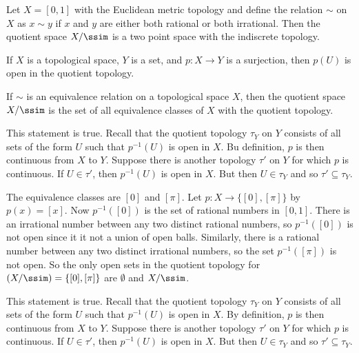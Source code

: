	\item Let $X = [0,1]$ with the Euclidean metric topology and define the relation $\sim$ on $X$ as $x \sim y$ if $x$ and $y$ are either both rational or both irrational. Then the quotient space $X/\ssim$ is a two point space with the indiscrete topology. 

	\item If $X$ is a topological space, $Y$ is a set, and $p: X \to Y$ is a surjection, then $p(U)$ is open in the quotient topology.

	\item If $\sim$ is an equivalence relation on a topological space $X$, then the quotient space $X/\ssim$ is the set of all equivalence classes of $X$ with the quotient topology. 
		
	\ea


\ExerciseSolution

\ba

\item This statement is true. Recall that the quotient topology $\tau_Y$ on $Y$ consists of all sets of the form $U$ such that $p^{-1}(U)$ is open in $X$.  Bu definition, $p$ is then continuous from $X$ to $Y$. Suppose there is another topology $\tau'$ on $Y$ for which $p$ is continuous. If $U \in \tau'$, then $p^{-1}(U)$ is open in $X$. But then $U \in \tau_Y$ and so $\tau' \subseteq \tau_Y$. 
	
	\item The equivalence classes are $[0]$ and $[\pi]$. Let $p: X \to \{[0], [\pi]\}$ by $p(x) = [x]$. Now $p^{-1}([0])$ is the set of rational numbers in $[0,1]$. There is an irrational number between any two distinct rational numbers, so $p^{-1}([0])$ is not open since it it not a union of open balls. Similarly, there is a rational number between any two distinct irrational numbers, so the set $p^{-1}([\pi])$ is not open. So the only open sets in the quotient topology for $(X/\ssim) = \{[0], [\pi]\}$ are $\emptyset$ and $X/\ssim$.

\item This statement is true. Recall that the quotient topology $\tau_Y$ on $Y$ consists of all sets of the form $U$ such that $p^{-1}(U)$ is open in $X$.  By definition, $p$ is then continuous from $X$ to $Y$. Suppose there is another topology $\tau'$ on $Y$ for which $p$ is continuous. If $U \in \tau'$, then $p^{-1}(U)$ is open in $X$. But then $U \in \tau_Y$ and so $\tau' \subseteq \tau_Y$. 
	
